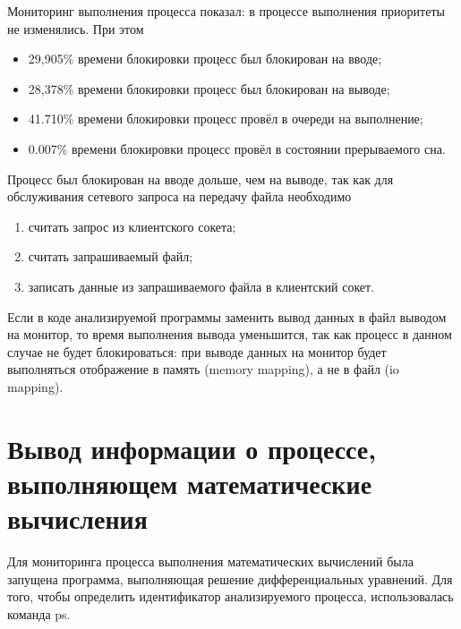 Мониторинг выполнения процесса показал: в процессе выполнения приоритеты не изменялись. При этом 

\begin{itemize}[label*=---]
	\item 29,905\% времени блокировки процесс был блокирован на вводе;
	\item 28,378\% времени блокировки процесс был блокирован на выводе;
	\item 41.710\% времени блокировки процесс провёл в очереди на выполнение;
	\item 0.007\% времени блокировки процесс провёл в состоянии прерываемого сна.
\end{itemize}

Процесс был блокирован на вводе дольше, чем на выводе, так как для обслуживания сетевого запроса на передачу файла необходимо

\begin{enumerate}[label*=\arabic*)]
	\item считать запрос из клиентского сокета;
	\item считать запрашиваемый файл;
	\item записать данные из запрашиваемого файла в клиентский сокет.
\end{enumerate}

Если в коде анализируемой программы заменить вывод данных в файл выводом на монитор, то время выполнения вывода уменьшится, так как процесс в данном случае не будет блокироваться: при выводе данных на монитор будет выполняться отображение в память (memory mapping), а не в файл (io mapping).




\section{Вывод информации о процессе, выполняющем математические вычисления}

Для мониторинга процесса выполнения математических вычислений была запущена программа, выполняющая решение дифференциальных уравнений. Для того, чтобы определить идентификатор анализируемого процесса, использовалась команда ps.

